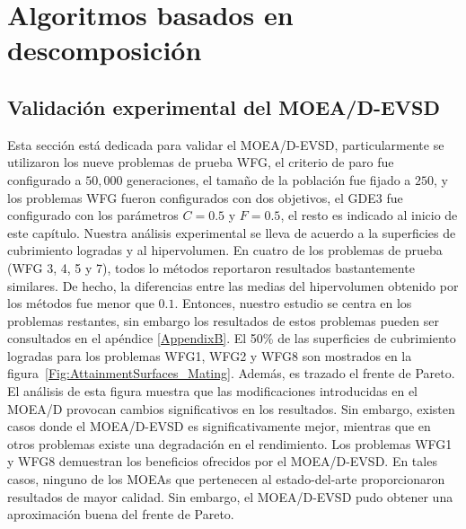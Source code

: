 

\section{Algoritmos basados en descomposición}

\subsection{Validación experimental del MOEA/D-EVSD}

Esta sección está dedicada para validar el MOEA/D-EVSD, particularmente se utilizaron los nueve problemas de prueba WFG, el criterio de paro fue configurado a $50,000$ generaciones, el tamaño de la población fue fijado a $250$, y los problemas WFG fueron configurados con dos objetivos, el GDE3 fue configurado con los parámetros $C=0.5$ y $F=0.5$, el resto es indicado al inicio de este capítulo.
%
Nuestra análisis experimental se lleva de acuerdo a la superficies de cubrimiento logradas y al hipervolumen.
%
En cuatro de los problemas de prueba (WFG 3, 4, 5 y 7), todos lo métodos reportaron resultados bastantemente similares.
%
De hecho, la diferencias entre las medias del hipervolumen obtenido por los métodos fue menor que $0.1$.
%
Entonces, nuestro estudio se centra en los problemas restantes, sin embargo los resultados de estos problemas pueden ser consultados en el apéndice \ref{AppendixB}.
%
El 50\% de las superficies de cubrimiento logradas para los problemas WFG1, WFG2 y WFG8 son mostrados en la figura~\ref{Fig:AttainmentSurfaces_Mating}. 
%
Además, es trazado el frente de Pareto.
%
El análisis de esta figura muestra que las modificaciones introducidas en el MOEA/D provocan cambios significativos en los resultados.
%
Sin embargo, existen casos donde el MOEA/D-EVSD es significativamente mejor, mientras que en otros problemas existe una degradación en el rendimiento.
%
Los problemas WFG1 y WFG8 demuestran los beneficios ofrecidos por el MOEA/D-EVSD.
%
En tales casos, ninguno de los MOEAs que pertenecen al estado-del-arte proporcionaron resultados de mayor calidad.
%
Sin embargo, el MOEA/D-EVSD pudo obtener una aproximación buena del frente de Pareto.


